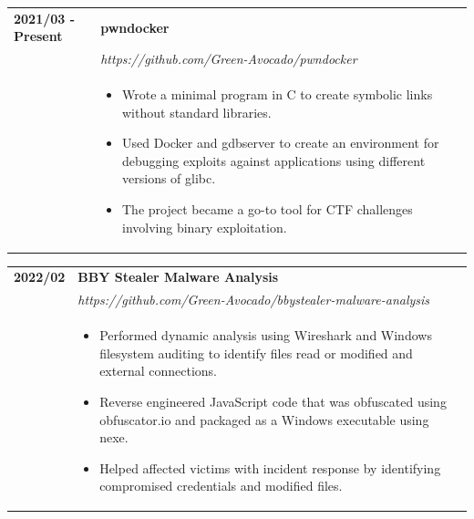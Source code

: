 \documentclass[letterpaper]{article}
\begin{document}
        \begin{tabular}{p{} p{}}
            \textbf{2021/03 - Present} & \textbf{pwndocker} \\
            & \emph{https://github.com/Green-Avocado/pwndocker} \\
            & \begin{itemize}
                \item Wrote a minimal program in C to create symbolic links without standard libraries.
                \item Used Docker and gdbserver to create an environment for debugging exploits against
                    applications using different versions of glibc.
                \item The project became a go-to tool for CTF challenges involving binary exploitation.
            \end{itemize}
            \\
        \end{tabular}

        \begin{tabular}{p{} p{}}
            \textbf{2022/02} & \textbf{BBY Stealer Malware Analysis} \\
            & \emph{https://github.com/Green-Avocado/bbystealer-malware-analysis} \\
            & \begin{itemize}
                \item Performed dynamic analysis using Wireshark and Windows filesystem auditing to
                    identify files read or modified and external connections.
                \item Reverse engineered JavaScript code that was obfuscated using obfuscator.io and
                    packaged as a Windows executable using nexe.
                \item Helped affected victims with incident response by identifying compromised
                    credentials and modified files.
            \end{itemize}
            \\
        \end{tabular}
\end{document}

